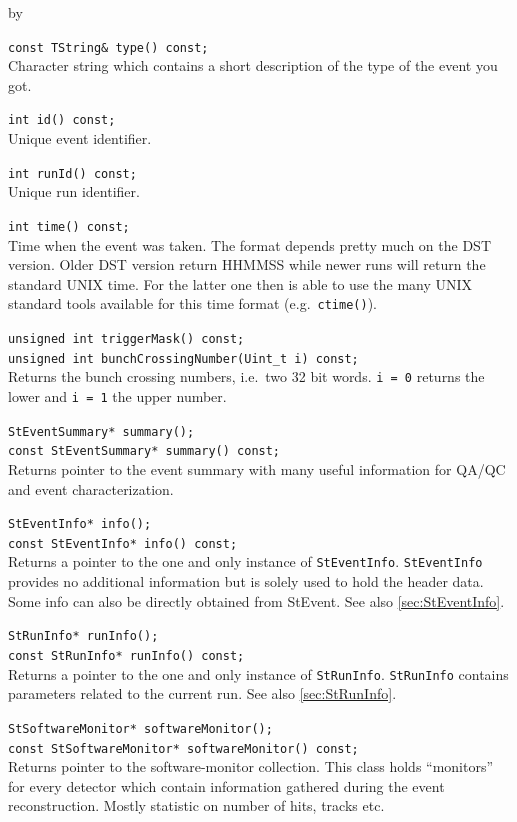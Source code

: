 \documentclass[twoside]{article}
\newcommand{\entrylabel}[1]{\mbox{\textbf{{#1}}}\hfil}%
\newenvironment{entry}
{\begin{list}{}%
    {\renewcommand{\makelabel}{\entrylabel}%
     \setlength{\labelwidth}{90pt}%
     \setlength{\leftmargin}{\labelwidth}
     \advance\leftmargin by \labelsep%
      }%
    }%
  {\end{list}}
\newcommand{\Entrylabel}[1]%
{\raisebox{0pt}[1ex][0pt]{\makebox[\labelwidth][l]%
    {\parbox[t]{\labelwidth}{\hspace{0pt}\textbf{{#1}}}}}}
\newenvironment{Entry}%
{\renewcommand{\entrylabel}{\Entrylabel}\begin{entry}}%
  {\end{entry}}
\begin{document}
\begin{Entry}
    \verb+const TString& type() const;+\\
    Character string which contains a short description of the type of
    the event you got.
    
    \verb+int id() const;+\\
    Unique event identifier.
    
    \verb+int runId() const;+\\
    Unique run identifier.
    
    \verb+int time() const;+\\
    Time when the event was taken. The format depends pretty much
    on the DST version. Older DST version return HHMMSS while newer
    runs will return the standard UNIX time. For the latter one then
    is able to use the many UNIX standard tools available for this
    time format (e.g.~\texttt{ctime()}).
    
    \verb+unsigned int triggerMask() const;+\\

    \verb+unsigned int bunchCrossingNumber(Uint_t i) const;+\\       
    Returns the bunch crossing numbers, i.e.~two 32 bit words.
    \texttt{i = 0} returns the lower and \texttt{i = 1} the upper number.

    \verb+StEventSummary* summary();+\\
    \verb+const StEventSummary* summary() const;+\\
    Returns pointer to the event summary with many useful information
    for QA/QC and event characterization.

    \verb+StEventInfo* info();+\\
    \verb+const StEventInfo* info() const;+\\
    Returns a pointer to the one and only instance of \texttt{StEventInfo}.
    \texttt{StEventInfo} provides no additional information but is solely
    used to hold the header data. Some info can also be directly obtained  from
    StEvent. See also \ref{sec:StEventInfo}.

    \verb+StRunInfo* runInfo();+\\
    \verb+const StRunInfo* runInfo() const;+\\
    Returns a pointer to the one and only instance of \texttt{StRunInfo}.
    \texttt{StRunInfo} contains parameters related to the current run.
    See also \ref{sec:StRunInfo}.

    \verb+StSoftwareMonitor* softwareMonitor();+\\
    \verb+const StSoftwareMonitor* softwareMonitor() const;+\\
    Returns pointer to the software-monitor collection. This class
    holds ``monitors'' for every detector which contain information
    gathered during the event reconstruction. Mostly statistic on
    number of hits, tracks etc.
    

\end{Entry}
\end{document}
